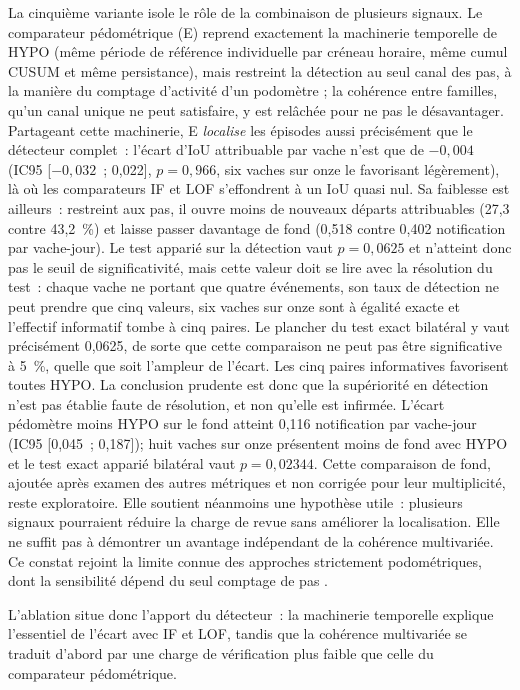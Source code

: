 La cinquième variante isole le rôle de la combinaison de plusieurs signaux. Le comparateur
pédométrique (E) reprend exactement la machinerie temporelle de HYPO (même période de référence
individuelle par créneau horaire, même cumul CUSUM et même persistance), mais restreint la
détection au seul canal des pas, à la manière du comptage d'activité d'un podomètre
\citep{alsaaod2012electronic}; la cohérence entre familles, qu'un canal unique ne peut
satisfaire, y est relâchée pour ne pas le désavantager. Partageant cette machinerie, E
\emph{localise} les épisodes aussi précisément que le détecteur complet~: l'écart d'IoU
attribuable par vache n'est que de $-0{,}004$ (IC95 [$-0{,}032$~; 0,022], $p=0{,}966$, six
vaches sur onze le favorisant légèrement), là où les comparateurs IF et LOF s'effondrent à
un IoU quasi nul. Sa faiblesse est ailleurs~: restreint aux pas, il ouvre moins de nouveaux
    départs attribuables (27,3 contre 43,2~\%) et laisse passer davantage de fond (0,518 contre
    0,402 notification par vache-jour). Le test apparié sur la détection vaut $p=0{,}0625$ et
    n'atteint donc pas le seuil de significativité, mais cette valeur doit se lire avec la
    résolution du test~: chaque vache ne portant que quatre événements, son taux de détection ne
    peut prendre que cinq valeurs, six vaches sur onze sont à égalité exacte et l'effectif
    informatif tombe à cinq paires. Le plancher du test exact bilatéral y vaut précisément
    0,0625, de sorte que cette comparaison ne peut pas être significative à 5~\%, quelle que soit
    l'ampleur de l'écart. Les cinq paires informatives favorisent toutes HYPO. La conclusion
    prudente est donc que la supériorité en détection n'est pas établie faute de résolution, et
    non qu'elle est infirmée. L'écart pédomètre moins HYPO sur le fond atteint 0,116
    notification par vache-jour (IC95 [0,045~; 0,187]); huit vaches sur onze présentent moins de
    fond avec HYPO et le test exact apparié bilatéral vaut $p=0{,}02344$. Cette comparaison de
    fond, ajoutée après examen des autres métriques et non corrigée pour leur multiplicité, reste
    exploratoire. Elle soutient néanmoins une hypothèse utile~: plusieurs signaux pourraient
    réduire la charge de revue sans améliorer la localisation. Elle ne suffit pas à démontrer un
    avantage indépendant de la cohérence multivariée. Ce constat rejoint la limite connue des
approches strictement podométriques, dont la sensibilité dépend du seul comptage de pas
\citep{alsaaod2012electronic,oleary2020accelerometers}.

L'ablation situe donc l'apport du détecteur~: la machinerie temporelle explique l'essentiel de
l'écart avec IF et LOF, tandis que la cohérence multivariée se traduit d'abord par une charge
de vérification plus faible que celle du comparateur pédométrique.


